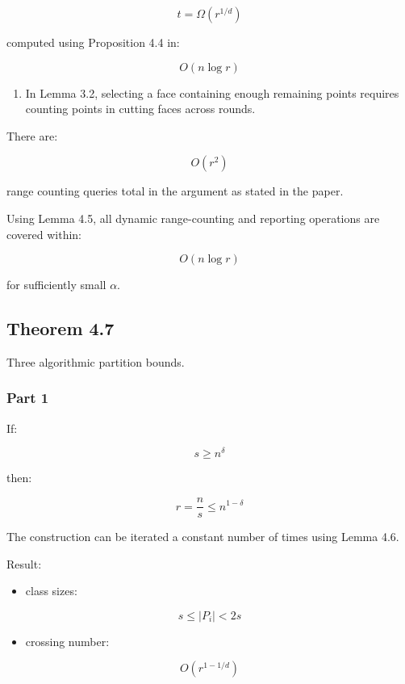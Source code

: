 \documentclass[
  11pt,
]{article}
\providecommand{\tightlist}{%
  \setlength{\itemsep}{0pt}\setlength{\parskip}{0pt}}
\begin{document}
\[
t=\Omega(r^{1/d})
\]

computed using Proposition 4.4 in:

\[
O(n\log r)
\]

\begin{enumerate}
\def\labelenumi{\arabic{enumi}.}
\setcounter{enumi}{1}
\tightlist
\item
  In Lemma 3.2, selecting a face containing enough remaining points
  requires counting points in cutting faces across rounds.
\end{enumerate}

There are:

\[
O(r^2)
\]

range counting queries total in the argument as stated in the paper.

Using Lemma 4.5, all dynamic range-counting and reporting operations are
covered within:

\[
O(n\log r)
\]

for sufficiently small \(\alpha\).

\hypertarget{theorem-4.7}{%
\subsection{Theorem 4.7}\label{theorem-4.7}}

Three algorithmic partition bounds.

\hypertarget{part-1}{%
\subsubsection{Part 1}\label{part-1}}

If:

\[
s\ge n^\delta
\]

then:

\[
r=\frac{n}{s}\le n^{1-\delta}
\]

The construction can be iterated a constant number of times using Lemma
4.6.

Result:

\begin{itemize}
\tightlist
\item
  class sizes:
\end{itemize}

\[
s\le |P_i|<2s
\]

\begin{itemize}
\tightlist
\item
  crossing number:
\end{itemize}

\[
O(r^{1-1/d})
\]
\end{document}
